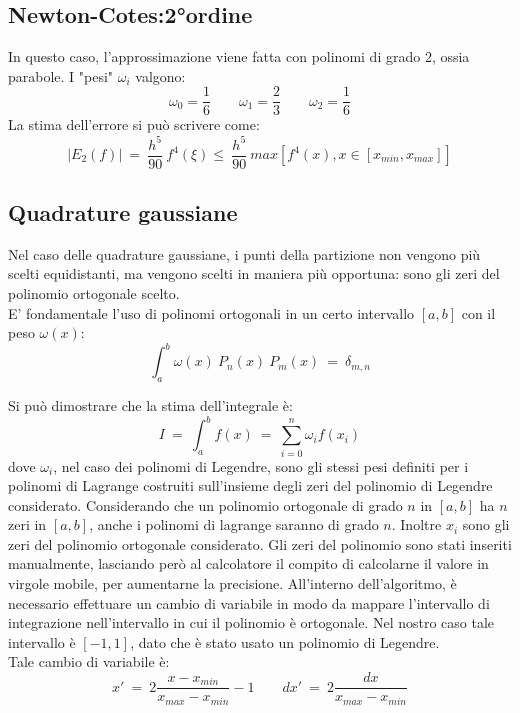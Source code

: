 \subsection*{Newton-Cotes:2°ordine}
In questo caso, l'approssimazione viene fatta con polinomi di grado 2, ossia parabole.
I "pesi" $\omega_i$ valgono:
$$
	\omega_0 = \frac{1}{6} \qquad  \omega_1 = \frac{2}{3} \qquad \omega_2 = \frac{1}{6}
$$
La stima dell'errore si può scrivere come:
$$
|E_2 (f) | \ = \  \frac{h^5}{90} \ f^4(\xi) \leq \ \frac{h^5}{90} \ max \left[ f^4( x), x \in [x_{min},x_{max}] \right]
$$
\subsection*{Quadrature gaussiane}
Nel caso delle quadrature gaussiane, i punti della partizione non vengono più scelti equidistanti,
ma vengono scelti in maniera più opportuna: sono gli zeri del polinomio ortogonale scelto.\\
E' fondamentale l'uso di polinomi ortogonali in un certo intervallo $[a,b]$ con il peso $\omega(x)$:
$$
	\int_a^b \omega(x)\ P_n{(x)} \ P_m{(x)} \ = \ \delta_{m,n}
$$

Si può dimostrare che la stima dell'integrale è:
$$
 I \ = \  \int_a^b f(x) \ = \ \sum_{i=0}^n \omega_i f(x_i)
$$
dove $\omega_i$, nel caso dei polinomi di Legendre, sono gli stessi pesi definiti per i polinomi di Lagrange costruiti sull'insieme degli zeri
del polinomio di Legendre considerato. Considerando che un polinomio ortogonale di grado $n$ in $[a,b]$ ha $n$ zeri in $[a,b]$, anche i polinomi
di lagrange saranno di grado $n$. Inoltre $x_i$ sono gli zeri del polinomio ortogonale considerato.
Gli zeri del polinomio sono stati inseriti manualmente, lasciando però al calcolatore il compito di calcolarne il valore in virgole mobile,
per aumentarne la precisione.
All'interno dell'algoritmo, è necessario effettuare un cambio di variabile in modo da mappare l'intervallo
di integrazione nell'intervallo in cui il polinomio è ortogonale. Nel nostro caso tale intervallo è $[-1,1]$,
dato che è stato usato un polinomio di Legendre.\\
Tale cambio di variabile è:
$$
	x' \ = \ 2 \frac{x - x_{min} }{x_{max}-x_{min}} - 1 \qquad dx'  \ = \ 2 \frac{dx}{x_{max}-x_{min}}
$$
